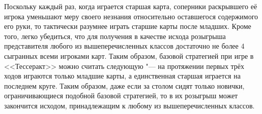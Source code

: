 Поскольку каждый раз, когда играется старшая карта, соперники раскрывшего её игрока уменьшают меру своего незнания относительно оставшегося содержимого его руки, то тактически разумнее играть старшие карты после младших. Кроме того, легко убедиться, что для получения в качестве исхода розыгрыша представителя любого из вышеперечисленных классов достаточно не более 4 сыгранных всеми игроками карт. Таким образом, базовой стратегией при игре в <<Тессеракт>> можно считать следующую "--- на протяжении первых трёх ходов играются только младшие карты, а единственная старшая играется на последнем круге. Таким образом, даже если за столом сидят только новички, ограничивающиеся подобной базовой стратегией, то в их розыгрыш может закончится исходом, принадлежащим к любому из вышеперечисленных классов.

%
%
%
